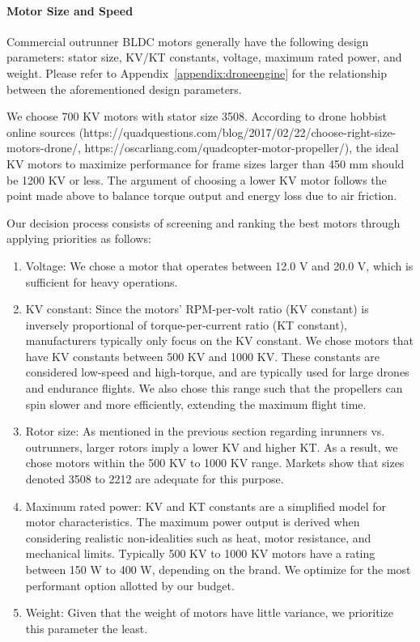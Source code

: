 \paragraph{Motor Size and Speed}\label{section:motor-speed}

Commercial outrunner BLDC motors generally have the following design parameters: stator size, KV/KT constants, voltage, maximum rated power, and weight. Please refer to Appendix~\ref{appendix:droneengine} for the relationship between the aforementioned design parameters. 

We choose 700 KV motors with stator size 3508.  According to drone hobbist online sources (https://quadquestions.com/blog/2017/02/22/choose-right-size-motors-drone/, https://oscarliang.com/quadcopter-motor-propeller/), the ideal KV motors to maximize performance for frame sizes larger than 450 mm should be 1200 KV or less. The argument of choosing a lower KV motor follows the point made above to balance torque output and energy loss due to air friction.

Our decision process consists of screening and ranking the best motors through applying priorities as follows:

\begin{enumerate}
    \item Voltage: We chose a motor that operates between 12.0 V and 20.0 V, which is sufficient for heavy operations.
    \item KV constant: Since the motors' RPM-per-volt ratio (KV constant) is inversely proportional of torque-per-current ratio (KT constant), manufacturers typically only focus on the KV constant. We chose motors that have KV constants between 500 KV and 1000 KV. These constants are considered low-speed and high-torque, and are typically used for large drones and endurance flights. We also chose this range such that the propellers can spin slower and more efficiently, extending the maximum flight time.
    \item Rotor size: As mentioned in the previous section regarding inrunners vs. outrunners, larger rotors imply a lower KV and higher KT. As a result, we chose motors within the 500 KV to 1000 KV range. Markets show that sizes denoted 3508 to 2212 are adequate for this purpose.
    \item Maximum rated power: KV and KT constants are a simplified model for motor characteristics. The maximum power output is derived when considering realistic non-idealities such as heat, motor resistance, and mechanical limits. Typically 500 KV to 1000 KV motors have a rating between 150 W to 400 W, depending on the brand. We optimize for the most performant option allotted by our budget.
    \item Weight: Given that the weight of motors have little variance, we prioritize this parameter the least.
\end{enumerate}

